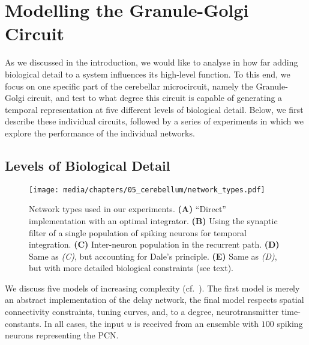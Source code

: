 
\section{Modelling the Granule-Golgi Circuit}

As we discussed in the introduction, we would like to analyse in how far adding biological detail to a system influences its high-level function.
To this end, we focus on one specific part of the cerebellar microcircuit, namely the Granule-Golgi circuit, and test to what degree this circuit is capable of generating a temporal representation at five different levels of biological detail.
Below, we first describe these individual circuits, followed by a series of experiments in which we explore the performance of the individual networks.

\subsection{Levels of Biological Detail}

\begin{figure}
	\centering
	\texttt{[image: media/chapters/05\_cerebellum/network\_types.pdf]}%
	{\label{fig:cerebellum_network_types_a}}%
	{\label{fig:cerebellum_network_types_b}}%
	{\label{fig:cerebellum_network_types_c}}%
	{\label{fig:cerebellum_network_types_d}}%
	{\label{fig:cerebellum_network_types_e}}%
	\caption[Network types used in the cerebellum experiments.]{Network types used in our experiments. \textbf{(A)} \enquote{Direct} implementation with an optimal integrator. \textbf{(B)} Using the synaptic filter of a single population of spiking neurons for temporal integration. \textbf{(C)} Inter-neuron population in the recurrent path. \textbf{(D)} Same as \emph{(C)}, but accounting for Dale's principle. \textbf{(E)} Same as \emph{(D)}, but with more detailed biological constraints (see text).}
	\label{fig:cerebellum_network_types}
\end{figure}

We discuss five models of increasing complexity (cf.~).
The first model is merely an abstract implementation of the delay network, the final model respects spatial connectivity constraints, tuning curves, and, to a degree, neurotransmitter time-constants.
In all cases, the input $u$ is received from an \NEF ensemble with $100$ spiking \LIF neurons representing the PCN.

